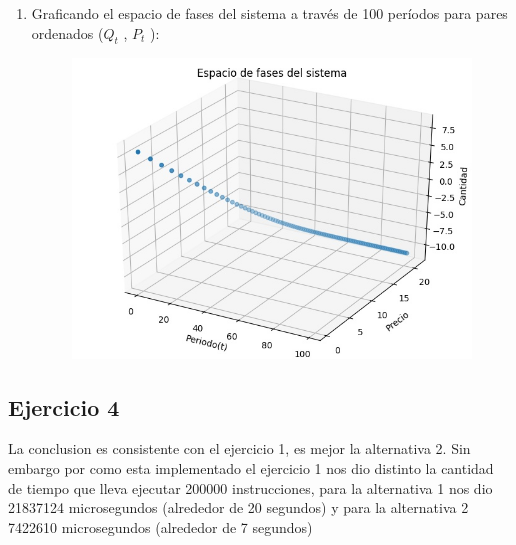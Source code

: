 \documentclass[11pt,a4paper]{article}
\begin{document}
\begin{enumerate}
			\item Graficando el espacio de fases del sistema a través de 100 períodos para pares ordenados ($Q_t$ , $P_t$ ):
				\begin{figure}[H]
  					\centering
    					\includegraphics[width=14cm]{imagenes/diagramaDeFases}
				\end{figure}

		\end{enumerate}
		
		

	\subsection{Ejercicio 4}
		La conclusion es consistente con el ejercicio 1, es mejor la alternativa 2. Sin embargo por como esta implementado el ejercicio 1 nos dio distinto la cantidad de tiempo que lleva ejecutar 200000 instrucciones, para la alternativa 1 nos dio  21837124 microsegundos (alrededor de 20 segundos) y para la alternativa 2  7422610 microsegundos (alrededor de 7 segundos)
\end{document}
